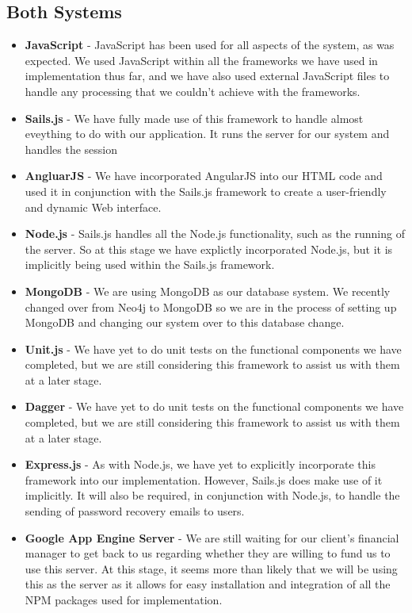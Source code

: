 \documentclass[11pt,fleqn]{book} %
\begin{document}
		\subsection{Both Systems}
			\begin{itemize}
				\item\textbf{JavaScript} -
				JavaScript has been used for all aspects of the system, as was expected. We used JavaScript within all the frameworks we have used in implementation thus far, and we have also used external JavaScript files to handle any processing that we couldn't achieve with the frameworks.
				
				\item\textbf{Sails.js} -
				We have fully made use of this framework to handle almost eveything to do with our application. It runs the server for our system and handles the session
				
				\item\textbf{AngluarJS} -
				We have incorporated AngularJS into our HTML code and used it in conjunction with the Sails.js framework to create a user-friendly and dynamic Web interface.
				
				\item\textbf{Node.js} -
				Sails.js handles all the Node.js functionality, such as the running of the server. So at this stage we have explictly incorporated Node.js, but it is implicitly being used within the Sails.js framework.				
				
				\item\textbf{MongoDB} -
				We are using MongoDB as our database system. We recently changed over from Neo4j to MongoDB so we are in the process of setting up MongoDB and changing our system over to this database change.
				
				\item\textbf{Unit.js} -
				We have yet to do unit tests on the functional components we have completed, but we are still considering this framework to assist us with them at a later stage.
				
				\item\textbf{Dagger} -
				We have yet to do unit tests on the functional components we have completed, but we are still considering this framework to assist us with them at a later stage.
				
				\item\textbf{Express.js} -
				As with Node.js, we have yet to explicitly incorporate this framework into our implementation. However, Sails.js does make use of it implicitly. It will also be required, in conjunction with Node.js, to handle the sending of password recovery emails to users.
				
				\item\textbf{Google App Engine Server} -
				We are still waiting for our client's financial manager to get back to us regarding whether they are willing to fund us to use this server. At this stage, it seems more than likely that we will be using this as the server as it allows for easy installation and integration of all the NPM packages used for implementation.			
			\end{itemize}	
	
\end{document}
